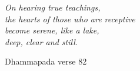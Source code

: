 
\cleartorecto
\begin{quotepage}{60mm}
\centering
\itshape
On hearing true teachings,\\
the hearts of those who are receptive\\
become serene, like a lake,\\
deep, clear and still.

{\smaller Dhammapada verse 82}
\end{quotepage}

